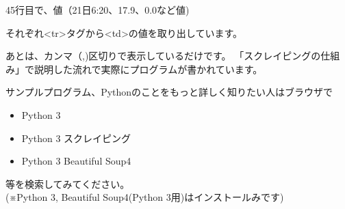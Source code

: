 45行目で、値（21日6:20、17.9、0.0など値)

それぞれ{\textless}tr{\textgreater}タグから{\textless}td{\textgreater}の値を取り出しています。


あとは、カンマ（,)区切りで表示しているだけです。
「スクレイピングの仕組み」で説明した流れで実際にプログラムが書かれています。




サンプルプログラム、Pythonのことをもっと詳しく知りたい人はブラウザで

\begin{itemize}
\item Python 3
\item Python 3 スクレイピング
\item Python 3 Beautiful Soup4
\end{itemize}
等を検索してみてください。\\

(※Python 3, Beautiful Soup4(Python
3用)はインストールみです)